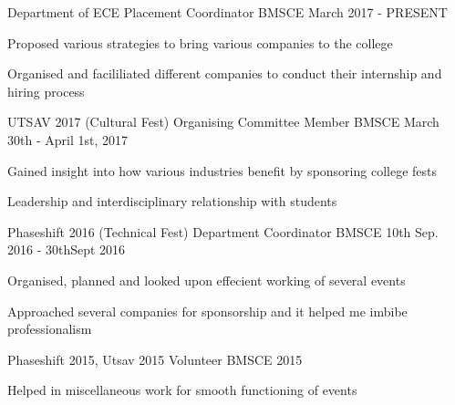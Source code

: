 \begin{cventries}
  \cventry
    {Department of ECE}
    {Placement Coordinator}
    {BMSCE}
    {March 2017 - PRESENT}
    {
      \begin{cvitems}
        \item {Proposed various strategies to bring various companies to the college}
        \item {Organised and facililiated different companies to conduct their internship and hiring process}
      \end{cvitems}
    }
    \cventry
    {UTSAV 2017 (Cultural Fest)}
    {Organising Committee Member}
    {BMSCE}
    {March 30th - April 1st, 2017}
    {
      \begin{cvitems}
        \item {Gained insight into how various industries benefit by sponsoring college fests}
         \item {Leadership and interdisciplinary relationship with students}
      \end{cvitems}
    }
  \cventry
    {Phaseshift 2016 (Technical Fest)}
    {Department Coordinator}
    {BMSCE}
    {10th Sep. 2016 - 30thSept 2016}
    {
      \begin{cvitems}
        \item {Organised, planned and looked upon effecient working of several events}
        \item {Approached several companies for sponsorship and it helped me imbibe professionalism}
      \end{cvitems}
    }
     \cventry
    {Phaseshift 2015, Utsav 2015}
    {Volunteer}
    {BMSCE}
    {2015}
    {
      \begin{cvitems}
        \item {Helped in miscellaneous work for smooth functioning of events}
      \end{cvitems}
    }
  
\end{cventries}
